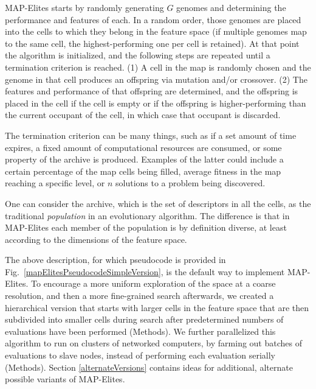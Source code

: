 \documentclass[twocolumn, DIV25, 9pt]{scrartcl}
\newcommand{\todoOfficialVersion}[1]{} %
\begin{document}
\todoOfficialVersion{this paragraph may be irrelevant if we are not talking to the EC community.}

%
%

MAP-Elites starts by randomly generating $G$ genomes and determining the performance and features of each. In a random order, those genomes are placed into the cells to which they belong in the feature space (if multiple genomes map to the same cell, the highest-performing one per cell is retained). At that point the algorithm is initialized, and the following steps are repeated until a termination criterion is reached. (1) A cell in the map is randomly chosen and the genome in that cell produces an offspring via mutation and/or crossover. (2) The features and performance of that offspring are determined, and the offspring is placed in the cell if the cell is empty or if the offspring is higher-performing than the current occupant of the cell, in which case that occupant is discarded. 

\todoOfficialVersion{Joost writes: One thing I have always wondered, why do you call it an archive, and not a map? I mean, it is MAP-Elites, not Archive-Elites, and the archive does not behave like an archive anyway (in contrast to novelty search, where the term archive makes a lot more sense).}
The termination criterion can be many things, such as if a set amount of time expires, a fixed amount of computational resources are consumed, or some property of the archive is produced. Examples of the latter could include a certain percentage of the map cells being filled, average fitness in the map reaching a specific level, or $n$ solutions to a problem being discovered. 

One can consider the archive, which is the set of descriptors in all the cells, as the traditional \emph{population} in an evolutionary algorithm. The difference is that in MAP-Elites each member of the population is by definition diverse, at least according to the dimensions of the feature space. 

The above description, for which pseudocode is provided in Fig.~\ref{mapElitesPseudocodeSimpleVersion}, is the default way to implement MAP-Elites. To encourage a more uniform exploration of the space at a coarse resolution, and then a more fine-grained search afterwards, we created a hierarchical version that starts with larger cells in the feature space that are then subdivided into smaller cells during search after predetermined numbers of evaluations have been performed (Methods). \todoOfficialVersion{Report whether preliminary experience show this is a good idea, and according to which criteria} We further parallelized this algorithm to run on clusters of networked computers, by farming out batches of evaluations to slave nodes, instead of performing each evaluation serially (Methods). Section \ref{alternateVersions} contains ideas for additional, alternate possible variants of MAP-Elites. 
\end{document}
